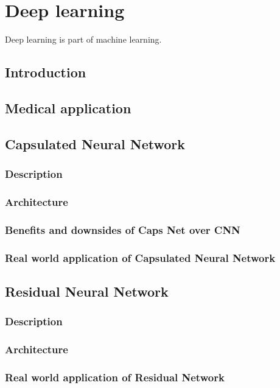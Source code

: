\chapter{Deep learning}
    Deep learning is part of machine learning. 
\section{Introduction}

\section{Medical application}

\section{Capsulated Neural Network}
    \subsection{Description}
    \subsection{Architecture}
    \subsection{Benefits and downsides of Caps Net over CNN}
    \subsection{Real world application of Capsulated Neural Network}

\section{Residual Neural Network}
    \subsection{Description}
    \subsection{Architecture}
    \subsection{Real world application of Residual Network}
